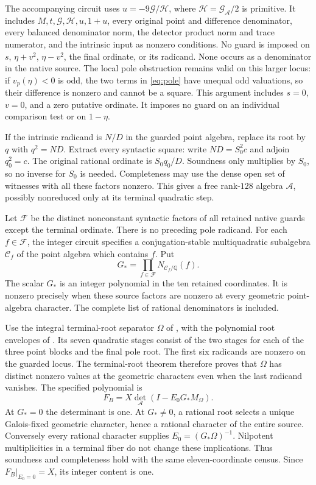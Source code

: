 \documentclass[11pt,a4paper]{article}
\newcommand{\Q}{\mathbb Q}\newcommand{\Z}{\mathbb Z}
\begin{document}
The accompanying circuit uses $u=-9\mathcal G/\mathcal H$, where
$\mathcal H=\mathcal G_{\mathcal A}/2$ is primitive. It includes
$M,t,\mathcal G,\mathcal H,u,1+u$, every original point and difference
denominator, every balanced denominator norm, the detector product norm
and trace numerator, and the intrinsic input as nonzero conditions.
No guard is imposed on $s$, $\eta+v^2$, $\eta-v^2$, the final
ordinate, or its radicand. None occurs as a denominator in the native
source. The local pole obstruction remains valid on this larger locus:
if $v_p(\eta)<0$ is odd, the two terms in \eqref{eq:pole} have
unequal odd valuations, so their difference is nonzero and cannot be a
square. This argument includes $s=0$, $v=0$, and a zero putative
ordinate. It imposes no guard on an individual comparison test or on
$1-\eta$.

If the intrinsic radicand is $N/D$ in the guarded point algebra,
replace its root by $q$ with $q^2=ND$. Extract every syntactic square:
write $ND=S_0^2c$ and adjoin $q_0^2=c$. The original rational
ordinate is $S_0q_0/D$. Soundness only multiplies by $S_0$, so no
inverse for $S_0$ is needed. Completeness may use the dense open set
of witnesses with all these factors nonzero. This gives a free
rank-$128$ algebra $\mathcal A$, possibly nonreduced only at its
terminal quadratic step.

Let $\mathcal F$ be the distinct nonconstant syntactic factors of all
retained native guards except the terminal ordinate. There is no
preceding pole radicand. For each $f\in\mathcal F$, the integer
circuit specifies a conjugation-stable multiquadratic subalgebra
$\mathcal C_f$ of the point algebra which contains $f$. Put
\[
 G_*=\prod_{f\in\mathcal F}N_{\mathcal C_f/\Q}(f).
\]
The scalar $G_*$ is an integer polynomial in the ten retained
coordinates. It is nonzero precisely when these source factors are
nonzero at every geometric point-algebra character. The complete
list of rational denominators is included.

Use the integral terminal-root separator $\Omega$ of
\cite[Section 3]{Terminal}, with the polynomial root envelopes of
\cite{Subalgebra}. Its seven quadratic stages consist of the two
stages for each of the three point blocks and the final pole root.
The first six radicands are nonzero on the guarded locus. The
terminal-root theorem therefore proves that $\Omega$ has distinct
nonzero values at the geometric characters even when the last
radicand vanishes. The specified polynomial is
\[
                 F_B=X\det_{\mathcal A}(I-E_0G_*M_\Omega).
\]
At $G_*=0$ the determinant is one. At $G_*\ne0$, a rational root
selects a unique Galois-fixed geometric character, hence a rational
character of the entire source. Conversely every rational character
supplies $E_0=(G_*\Omega)^{-1}$. Nilpotent multiplicities in a
terminal fiber do not change these implications. Thus soundness and
completeness hold with the same eleven-coordinate census. Since
$F_B|_{E_0=0}=X$, its integer content is one.
\end{document}
